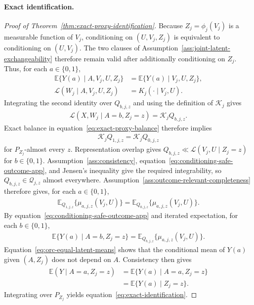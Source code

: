 \paragraph{Exact identification.}
\begin{proof}[Proof of Theorem~\ref{thm:exact-proxy-identification}]
Because $Z_j=\phi_j(V_j)$ is a measurable function of $V_j$, conditioning on $(U,V_j,Z_j)$ is equivalent to conditioning on $(U,V_j)$. The two clauses of Assumption~\ref{ass:joint-latent-exchangeability} therefore remain valid after additionally conditioning on $Z_j$. Thus, for each $a\in\{0,1\}$,
\begin{align}
\mathbb E\{Y(a)\mid A,V_j,U,Z_j\}
&=
\mathbb E\{Y(a)\mid V_j,U,Z_j\},
\label{eq:conditioning-safe-outcome-app}\\
\mathcal L(W_j\mid A,V_j,U,Z_j)
&=
K_j(\cdot\mid V_j,U).
\label{eq:common-channel-after-z-app}
\end{align}
Integrating the second identity over $Q_{b,j,z}$ and using the definition of $\mathcal K_j$ gives
\begin{align}
\mathcal L(X,W_j\mid A=b,Z_j=z)
=
\mathcal K_jQ_{b,j,z}.
\label{eq:held-out-proxy-factorization-app}
\end{align}
Exact balance in equation~\eqref{eq:exact-proxy-balance} therefore implies
\begin{align}
\mathcal K_jQ_{1,j,z}=\mathcal K_jQ_{0,j,z}
\label{eq:balanced-channel-images-app}
\end{align}
for $P_{Z_j}$-almost every $z$. Representation overlap gives $Q_{b,j,z}\ll\mathcal L(V_j,U\mid Z_j=z)$ for $b\in\{0,1\}$. Assumption~\ref{ass:consistency}, equation~\eqref{eq:conditioning-safe-outcome-app}, and Jensen's inequality give the required integrability, so $Q_{b,j,z}\in\mathcal Q_{j,z}$ almost everywhere. Assumption~\ref{ass:outcome-relevant-completeness} therefore gives, for each $a\in\{0,1\}$,
\begin{align}
\mathbb E_{Q_{1,j,z}}\{\mu_{a,j,z}(V_j,U)\}
=
\mathbb E_{Q_{0,j,z}}\{\mu_{a,j,z}(V_j,U)\}.
\label{eq:orc-equal-latent-means}
\end{align}
By equation~\eqref{eq:conditioning-safe-outcome-app} and iterated expectation, for each $b\in\{0,1\}$,
\begin{align}
\mathbb E\{Y(a)\mid A=b,Z_j=z\}
=
\mathbb E_{Q_{b,j,z}}\{\mu_{a,j,z}(V_j,U)\}.
\end{align}
Equation~\eqref{eq:orc-equal-latent-means} shows that the conditional mean of $Y(a)$ given $(A,Z_j)$ does not depend on $A$. Consistency then gives
\begin{align}
\mathbb E(Y\mid A=a,Z_j=z)
&=
\mathbb E\{Y(a)\mid A=a,Z_j=z\}
\nonumber\\
&=
\mathbb E\{Y(a)\mid Z_j=z\}.
\end{align}
Integrating over $P_{Z_j}$ yields equation~\eqref{eq:exact-identification}.\qedhere
\end{proof}


